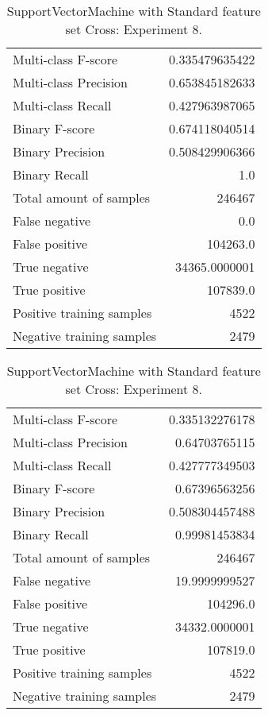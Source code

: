 \begin{table}[H]
\begin{minipage}{0.5\textwidth}
\caption{SupportVectorMachine with Standard feature set Cross: Experiment 7.}
\centering
\begin{tabular}{l r}
\toprule
Multi-class F-score & 0.335479635422 \\
Multi-class Precision & 0.653845182633 \\
Multi-class Recall & 0.427963987065 \\
\midrule
Binary F-score & 0.674118040514 \\
Binary Precision & 0.508429906366 \\
Binary Recall & 1.0 \\
\midrule
Total amount of samples & 246467 \\
False negative & 0.0 \\
False positive & 104263.0 \\
True negative & 34365.0000001 \\
True positive & 107839.0 \\
\midrule
Positive training samples & 4522 \\
Negative training samples & 2479 \\
\bottomrule
\end{tabular}
\end{minipage}
\hfillx
\begin{minipage}{0.5\textwidth}
\caption{SupportVectorMachine with Standard feature set Cross: Experiment 8.}
\centering
\begin{tabular}{l r}
\toprule
Multi-class F-score & 0.335132276178 \\
Multi-class Precision & 0.64703765115 \\
Multi-class Recall & 0.427777349503 \\
\midrule
Binary F-score & 0.67396563256 \\
Binary Precision & 0.508304457488 \\
Binary Recall & 0.99981453834 \\
\midrule
Total amount of samples & 246467 \\
False negative & 19.9999999527 \\
False positive & 104296.0 \\
True negative & 34332.0000001 \\
True positive & 107819.0 \\
\midrule
Positive training samples & 4522 \\
Negative training samples & 2479 \\
\bottomrule
\end{tabular}
\end{minipage}
\end{table}

